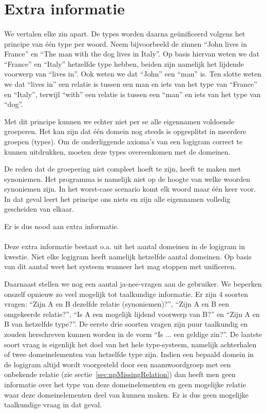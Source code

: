 \section{Extra informatie}
\paragraph{} We vertalen elke zin apart. De types worden daarna geünificeerd volgens het principe van één type per woord. Neem bijvoorbeeld de zinnen ``John lives in France'' en ``The man with the dog lives in Italy''. Op basis hiervan weten we dat ``France'' en ``Italy'' hetzelfde type hebben, beiden zijn namelijk het lijdende voorwerp van ``lives in''. Ook weten we dat ``John'' een ``man'' is. Ten slotte weten we dat ``lives in'' een relatie is tussen een man en iets van het type van ``France'' en ``Italy'', terwijl ``with'' een relatie is tussen een ``man'' en iets van het type van ``dog''.

Met dit principe kunnen we echter niet per se alle eigennamen voldoende groeperen. Het kan zijn dat één domein nog steeds is opgesplitst in meerdere groepen (types). Om de onderliggende axioma's van een logigram correct te kunnen uitdrukken, moeten deze types overeenkomen met de domeinen.

De reden dat de groepering niet compleet hoeft te zijn, heeft te maken met synoniemen. Het programma is namelijk niet op de hoogte van welke woorden synoniemen zijn. In het worst-case scenario komt elk woord maar één keer voor. In dat geval leert het principe ons niets en zijn alle eigennamen volledig gescheiden van elkaar.

Er is dus nood aan extra informatie.

\paragraph{} Deze extra informatie bestaat o.a. uit het aantal domeinen in de logigram in kwestie. Niet elke logigram heeft namelijk hetzelfde aantal domeinen. Op basis van dit aantal weet het systeem wanneer het mag stoppen met unificeren.

Daarnaast stellen we nog een aantal ja-nee-vragen aan de gebruiker. We beperken onszelf opnieuw zo veel mogelijk tot taalkundige informatie. Er zijn 4 soorten vragen: ``Zijn A en B dezelfde relatie (synoniemen)?'', ``Zijn A en B een omgekeerde relatie?'', ``Is A een mogelijk lijdend voorwerp van B?'' en ``Zijn A en B van hetzelfde type?''. De eerste drie soorten vragen zijn puur taalkundig en zouden herschreven kunnen worden in de vorm ``Is ... een geldige zin?''. De laatste soort vraag is eigenlijk het doel van het hele type-systeem, namelijk achterhalen of twee domeinelementen van hetzelfde type zijn. Indien een bepaald domein in de logigram altijd wordt voorgesteld door een naamwoordgroep met een onbekende relatie (zie sectie~\ref{sec:npMissingRelation}) dan heeft men geen informatie over het type van deze domeinelementen en geen mogelijke relatie waar deze domeinelementen deel van kunnen maken. Er is dus geen mogelijke taalkundige vraag in dat geval.

